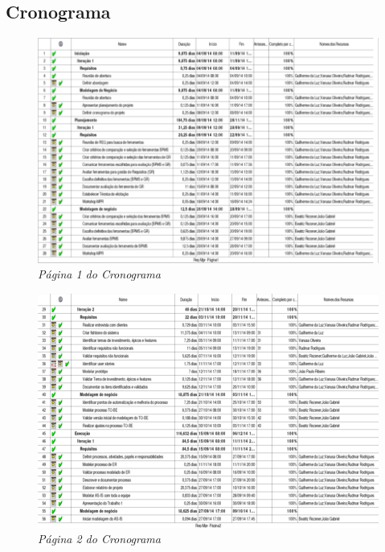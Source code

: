 \begin{apendicesenv}
\chapter{Cronograma}

\begin{figure}[H]
\centering\includegraphics[scale=0.5]{figuras/cronograma1.png}
\caption{\textit{Página 1 do Cronograma}}
\end{figure}

\begin{figure}[H]
\centering\includegraphics[scale=0.5]{figuras/cronograma2.png}
\caption{\textit{Página 2 do Cronograma}}
\end{figure}


\end{apendicesenv}
